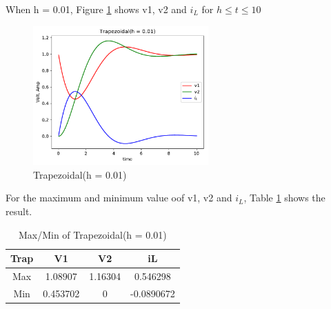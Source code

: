 \documentclass{article}
\begin{document}
When h = 0.01, Figure \ref{fig:trap 001} shows v1, v2 and $i_L$ for $h \leq t \leq 10$
\begin{figure}[H]
    \centering
    \includegraphics[width=0.6\textwidth]{src/trap_001.pdf}
    \caption{Trapezoidal(h = 0.01)}
    \label{fig:trap 001}
\end{figure}
For the maximum and minimum value oof v1, v2 and $i_L$, Table \ref{tab:trap 001} shows the result.
\begin{table}[htbp]
    \begin{center}
        \begin{tabular}{|c|c|c|c|}
            \hline
            Trap & V1 & V2 & iL \\ \hline
            Max & 1.08907 & 1.16304 & 0.546298 \\ \hline
            Min & 0.453702 & 0 & -0.0890672 \\ \hline
        \end{tabular}
    \end{center}
    \caption{Max/Min of Trapezoidal(h = 0.01)}
    \label{tab:trap 001}
\end{table}
\end{document}
